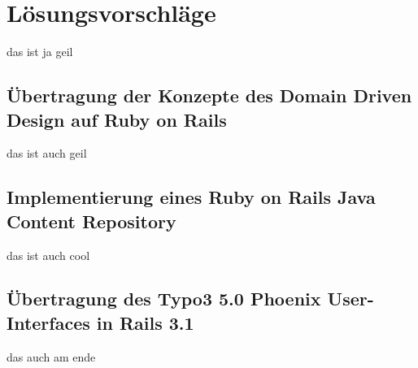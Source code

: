 \chapter{Lösungsvorschläge}
das ist ja geil
\section{Übertragung der Konzepte des Domain Driven Design auf Ruby on Rails}
das ist auch geil
\section{Implementierung eines Ruby on Rails Java Content Repository}
das ist auch cool
\section{Übertragung des Typo3 5.0 Phoenix User-Interfaces in Rails 3.1}
das auch am ende

